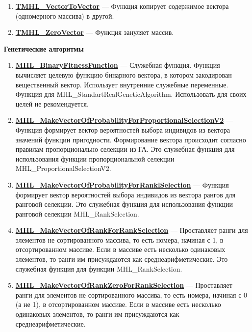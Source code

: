 \documentclass[a4paper,12pt]{article}
\begin{document}
\begin{enumerate}
\item \textbf{\hyperref[TMHL_VectorToVector]{TMHL\_VectorToVector}} --- Функция копирует содержимое вектора (одномерного массива) в другой.

\item \textbf{\hyperref[TMHL_ZeroVector]{TMHL\_ZeroVector}} --- Функция зануляет массив.

\end{enumerate}

\textbf{Генетические алгоритмы}
\begin{enumerate}

\item \textbf{\hyperref[MHL_BinaryFitnessFunction]{MHL\_BinaryFitnessFunction}} --- Служебная функция. Функция вычисляет целевую функцию бинарного вектора, в котором закодирован вещественный вектор. Использует внутренние служебные переменные. Функция для MHL\_StandartRealGeneticAlgorithm. Использовать для своих целей не рекомендуется.

\item \textbf{\hyperref[MHL_MakeVectorOfProbabilityForProportionalSelectionV2]{MHL\_MakeVectorOfProbabilityForProportionalSelectionV2}} --- Функция формирует вектор вероятностей выбора индивидов из вектора значений функции пригодности. Формирование вектора происходит согласно правилам пропорционально селекции из ГА. Это служебная функция для использования функции пропорциональной селекции MHL\_ProportionalSelectionV2.

\item \textbf{\hyperref[MHL_MakeVectorOfProbabilityForRanklSelection]{MHL\_MakeVectorOfProbabilityForRanklSelection}} --- Функция формирует вектор вероятностей выбора индивидов из вектора рангов для ранговой селекции. Это служебная функция для использования функции ранговой селекции MHL\_RankSelection.

\item \textbf{\hyperref[MHL_MakeVectorOfRankForRankSelection]{MHL\_MakeVectorOfRankForRankSelection}} --- Проставляет ранги для элементов не сортированного массива, то есть номера, начиная с 1, в отсортированном массиве.  Если в массиве есть несколько одинаковых элементов, то ранги им присуждаются как среднеарифметические. Это служебная функция для функции MHL\_RankSelection.

\item \textbf{\hyperref[MHL_MakeVectorOfRankZeroForRankSelection]{MHL\_MakeVectorOfRankZeroForRankSelection}} --- Проставляет ранги для элементов не сортированного массива, то есть номера, начиная с 0 (а не 1), в отсортированном массиве.  Если в массиве есть несколько одинаковых элементов, то ранги им присуждаются как среднеарифметические.


\end{enumerate}
\end{document}

